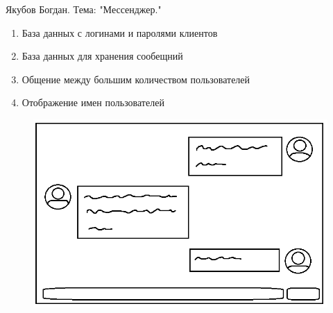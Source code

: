 \documentclass[a4paper, twoside] {report}
\begin{document}
	Якубов Богдан. Тема: "Мессенджер." 
	\begin{enumerate}
		\item База данных с логинами и паролями клиентов
		\item База данных для хранения сообещний 
		\item Общение между большим количеством пользователей   
		\item Отображение имен пользователей
	\end{enumerate}
	\begin{figure}[h]
		\centering
		\includegraphics[width=0.8\linewidth]{"Макет главного окна"}
		\caption[Рисунок 1. Макет главного окна]{}
	\end{figure}
	
\end{document}
